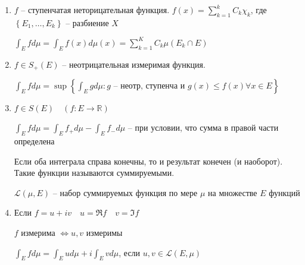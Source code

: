 \documentclass{book}
\newcommand\R{\ensuremath{\mathbb{R}}}
\theoremstyle{definition}
\begin{document}
\begin{enumerate}
    \item $f$ -- ступенчатая неторицательная функция.  $f(x) = \sum_{k=1}^{k} C_k\chi_k$, где $\left\{ E_1, \ldots, E_k \right\} $ -- разбиение $X$

        $\int_E fd\mu = \int_E f(x)d\mu(x) = \sum_{k=1}^{K} C_k \mu(E_k \cap E)$ 
    \item $f\in S_+(E)$ -- неотрицательная измеримая функция.

        $\int_E fd\mu = \sup\left\{ \int_Egd\mu: g \text{ -- неотр, ступенча и } g(x) \leqslant f(x) \forall x\in E \right\} $ 
    \item $f\in S(E)\quad (f:E \to \R)$

        $\int _E fd\mu = \int_E f_+d\mu - \int_Ef_-d\mu$ -- при условии, что сумма в правой части определена

        Если оба интеграла справа конечны, то и результат конечен (и наоборот). Такие функции называются суммируемыми.

        $\mathcal L(\mu, E)$ -- набор суммируемых функция по мере  $\mu$ на множестве  $E$ функций 
    \item Если $f=u+iv\quad u = \Re f\quad v = \Im f$

         $f$ измерима  $\iff  u, v$ измеримы

         $\int_E fd\mu = \int_E ud\mu + i \int_E vd\mu$, если $u, v\in \mathcal L(E, \mu)$
\end{enumerate}
\end{document}
